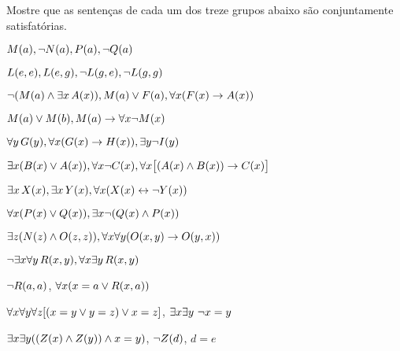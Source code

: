 \problempart
Mostre que as sentenças de cada um dos treze grupos abaixo são conjuntamente satisfatórias.
\begin{earg}
\item  $\mathord{M}(a), \neg \mathord{N}(a), \mathord{P}(a), \neg \mathord{Q}(a)$
\item $\mathord{L}(e,e), \mathord{L}(e,g), \neg \mathord{L}(g,e), \neg \mathord{L}(g,g)$
\item $\neg (\mathord{M}(a) \wedge \exists x\, \mathord{A}(x)), \mathord{M}(a) \vee \mathord{F}(a), \forall x(\mathord{F}(x) \rightarrow \mathord{A}(x))$
\item $\mathord{M}(a) \vee \mathord{M}(b), \mathord{M}(a) \rightarrow \forall x \neg \mathord{M}(x)$
\item $\forall y\, \mathord{G}(y), \forall x (\mathord{G}(x) \rightarrow \mathord{H}(x)), \exists y \neg \mathord{I}(y)$
\item $\exists x(\mathord{B}(x) \vee \mathord{A}(x)), \forall x \neg \mathord{C}(x), \forall x\bigl[(\mathord{A}(x) \wedge \mathord{B}(x)) \rightarrow \mathord{C}(x)\bigr]$
\item $\exists x\, \mathord{X}(x), \exists x\, \mathord{Y}(x), \forall x(\mathord{X}(x) \leftrightarrow \neg \mathord{Y}(x))$
\item $\forall x(\mathord{P}(x) \vee \mathord{Q}(x)), \exists x\neg(\mathord{Q}(x) \wedge \mathord{P}(x))$
\item $\exists z(\mathord{N}(z) \wedge \mathord{O}(z,z)), \forall x\forall y(\mathord{O}(x,y) \rightarrow \mathord{O}(y,x))$
\item $\neg \exists x \forall y\, \mathord{R}(x,y), \forall x \exists y\, \mathord{R}(x,y)$
\item $\neg \mathord{R}(a,a)$, $\forall x (x=a \vee \mathord{R}(x,a))$
\item $\forall x\forall y\forall z[(x=y \vee y=z )\vee x=z]$, $\exists x\exists y\ \neg x= y$
\item $\exists x\exists y((\mathord{Z}(x) \wedge \mathord{Z}(y) )\wedge x=y)$, $\neg \mathord{Z}(d)$, $d=e$
\end{earg}

